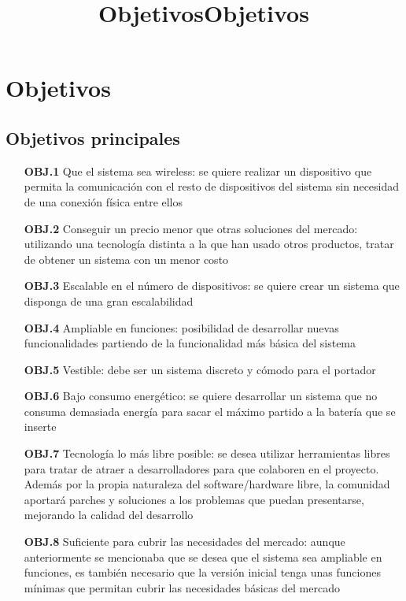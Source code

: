 \chapter{Objetivos}
\title{Objetivos}
\title{Objetivos}

\section{
Objetivos principales
}
  \begin{itemize}
    \item[\textbf{OBJ.1}] Que el sistema sea wireless: se quiere realizar un dispositivo que permita la comunicación con el resto de dispositivos del sistema sin necesidad de una conexión física entre ellos
    \item[\textbf{OBJ.2}] Conseguir un precio menor que otras soluciones del mercado: utilizando una tecnología distinta a la que han usado otros productos, tratar de obtener un sistema con un menor costo
    \item[\textbf{OBJ.3}] Escalable en el número de dispositivos: se quiere crear un sistema que disponga de una gran escalabilidad
    \item[\textbf{OBJ.4}] Ampliable en funciones: posibilidad de desarrollar nuevas funcionalidades partiendo de la funcionalidad más básica del sistema
    \item[\textbf{OBJ.5}] Vestible: debe ser un sistema discreto y cómodo para el portador
    \item[\textbf{OBJ.6}] Bajo consumo energético: se quiere desarrollar un sistema que no consuma demasiada energía para sacar el máximo partido a la batería que se inserte
    \item[\textbf{OBJ.7}] Tecnología lo más libre posible: se desea utilizar herramientas libres para tratar de atraer a desarrolladores para que colaboren en el proyecto. Además por la propia naturaleza del software/hardware libre, la comunidad aportará parches y soluciones a los problemas que puedan presentarse, mejorando la calidad del desarrollo
    \item[\textbf{OBJ.8}] Suficiente para cubrir las necesidades del mercado: aunque anteriormente se mencionaba que se desea que el sistema sea ampliable en funciones, es también necesario que la versión inicial tenga unas funciones mínimas que permitan cubrir las necesidades básicas del mercado
  \end{itemize}

